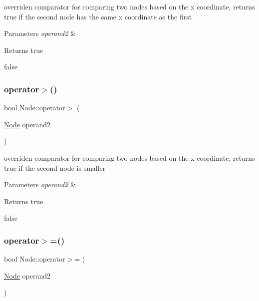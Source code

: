 overriden comparator for comparing two nodes based on the x coordinate, returns true if the second node has the same x coordinate as the first 


\begin{DoxyParams}{Parameters}
{\em operand2} & \\
\hline
\end{DoxyParams}
\begin{DoxyReturn}{Returns}
true 

false 
\end{DoxyReturn}
\mbox{\label{classNode_affe7b2f79e4364a4a37937a9b6e48861}} 
\subsubsection{\texorpdfstring{operator$>$()}{operator>()}}
{\footnotesize\ttfamily bool Node\+::operator$>$ (\begin{DoxyParamCaption}\item[{\hyperlink{classNode}{Node}}]{operand2 }\end{DoxyParamCaption})}



overriden comparator for comparing two nodes based on the x coordinate, returns true if the second node is smaller 


\begin{DoxyParams}{Parameters}
{\em operand2} & \\
\hline
\end{DoxyParams}
\begin{DoxyReturn}{Returns}
true 

false 
\end{DoxyReturn}
\mbox{\label{classNode_a193b8c52f135714e5b7ca95e4516b1ff}} 
\subsubsection{\texorpdfstring{operator$>$=()}{operator>=()}}
{\footnotesize\ttfamily bool Node\+::operator$>$= (\begin{DoxyParamCaption}\item[{\hyperlink{classNode}{Node}}]{operand2 }\end{DoxyParamCaption})}



